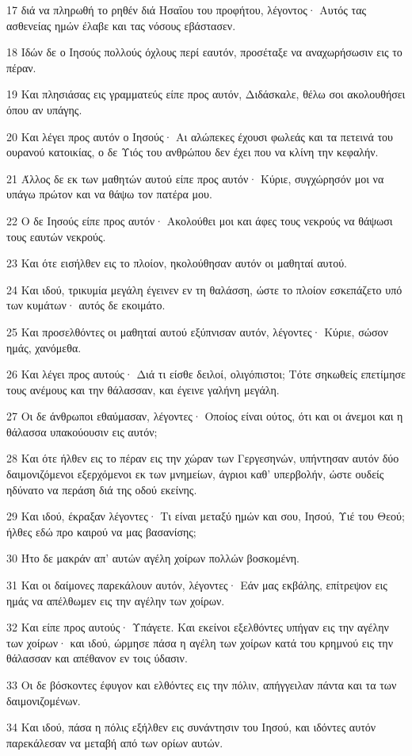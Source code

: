 \par 17 διά να πληρωθή το ρηθέν διά Ησαΐου του προφήτου, λέγοντος· Αυτός τας ασθενείας ημών έλαβε και τας νόσους εβάστασεν.
\par 18 Ιδών δε ο Ιησούς πολλούς όχλους περί εαυτόν, προσέταξε να αναχωρήσωσιν εις το πέραν.
\par 19 Και πλησιάσας εις γραμματεύς είπε προς αυτόν, Διδάσκαλε, θέλω σοι ακολουθήσει όπου αν υπάγης.
\par 20 Και λέγει προς αυτόν ο Ιησούς· Αι αλώπεκες έχουσι φωλεάς και τα πετεινά του ουρανού κατοικίας, ο δε Υιός του ανθρώπου δεν έχει που να κλίνη την κεφαλήν.
\par 21 Άλλος δε εκ των μαθητών αυτού είπε προς αυτόν· Κύριε, συγχώρησόν μοι να υπάγω πρώτον και να θάψω τον πατέρα μου.
\par 22 Ο δε Ιησούς είπε προς αυτόν· Ακολούθει μοι και άφες τους νεκρούς να θάψωσι τους εαυτών νεκρούς.
\par 23 Και ότε εισήλθεν εις το πλοίον, ηκολούθησαν αυτόν οι μαθηταί αυτού.
\par 24 Και ιδού, τρικυμία μεγάλη έγεινεν εν τη θαλάσση, ώστε το πλοίον εσκεπάζετο υπό των κυμάτων· αυτός δε εκοιμάτο.
\par 25 Και προσελθόντες οι μαθηταί αυτού εξύπνισαν αυτόν, λέγοντες· Κύριε, σώσον ημάς, χανόμεθα.
\par 26 Και λέγει προς αυτούς· Διά τι είσθε δειλοί, ολιγόπιστοι; Τότε σηκωθείς επετίμησε τους ανέμους και την θάλασσαν, και έγεινε γαλήνη μεγάλη.
\par 27 Οι δε άνθρωποι εθαύμασαν, λέγοντες· Οποίος είναι ούτος, ότι και οι άνεμοι και η θάλασσα υπακούουσιν εις αυτόν;
\par 28 Και ότε ήλθεν εις το πέραν εις την χώραν των Γεργεσηνών, υπήντησαν αυτόν δύο δαιμονιζόμενοι εξερχόμενοι εκ των μνημείων, άγριοι καθ' υπερβολήν, ώστε ουδείς ηδύνατο να περάση διά της οδού εκείνης.
\par 29 Και ιδού, έκραξαν λέγοντες· Τι είναι μεταξύ ημών και σου, Ιησού, Υιέ του Θεού; ήλθες εδώ προ καιρού να μας βασανίσης;
\par 30 Ήτο δε μακράν απ' αυτών αγέλη χοίρων πολλών βοσκομένη.
\par 31 Και οι δαίμονες παρεκάλουν αυτόν, λέγοντες· Εάν μας εκβάλης, επίτρεψον εις ημάς να απέλθωμεν εις την αγέλην των χοίρων.
\par 32 Και είπε προς αυτούς· Υπάγετε. Και εκείνοι εξελθόντες υπήγαν εις την αγέλην των χοίρων· και ιδού, ώρμησε πάσα η αγέλη των χοίρων κατά του κρημνού εις την θάλασσαν και απέθανον εν τοις ύδασιν.
\par 33 Οι δε βόσκοντες έφυγον και ελθόντες εις την πόλιν, απήγγειλαν πάντα και τα των δαιμονιζομένων.
\par 34 Και ιδού, πάσα η πόλις εξήλθεν εις συνάντησιν του Ιησού, και ιδόντες αυτόν παρεκάλεσαν να μεταβή από των ορίων αυτών.

